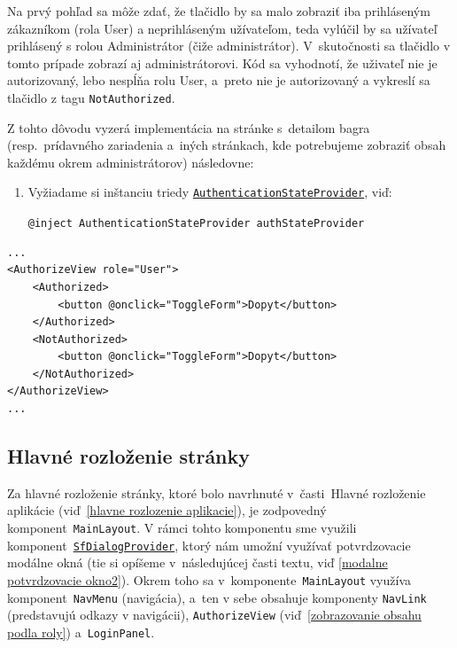 Na prvý pohľad sa môže zdať, že tlačidlo by sa malo zobraziť iba prihláseným zákazníkom (rola User) a neprihláseným užívateľom, teda vylúčil by sa užívateľ prihlásený s rolou Administrátor (čiže administrátor). V~skutočnosti sa tlačidlo v tomto prípade zobrazí aj administrátorovi. Kód sa vyhodnotí, že uživateľ nie je autorizovaný, lebo nespĺňa rolu User, a~preto nie je autorizovaný a vykreslí sa tlačidlo z tagu \verb|NotAuthorized|.

Z tohto dôvodu vyzerá implementácia na stránke s~detailom bagra (resp.~prídavného zariadenia a~iných stránkach, kde potrebujeme zobraziť obsah každému okrem administrátorov) následovne:

\begin{enumerate}
\item Vyžiadame si inštanciu triedy \href{https://learn.microsoft.com/en-us/dotnet/api/microsoft.aspnetcore.components.authorization.authenticationstateprovider?view=aspnetcore-7.0}{\texttt{AuthenticationStateProvider}}, viď:

\verb|@inject AuthenticationStateProvider authStateProvider|

\end{enumerate}

\begin{verbatim}
...
<AuthorizeView role="User">
	<Authorized>
		<button @onclick="ToggleForm">Dopyt</button>
	</Authorized>
	<NotAuthorized>
		<button @onclick="ToggleForm">Dopyt</button>
	</NotAuthorized>
</AuthorizeView>
...
\end{verbatim}

\fi

\subsection{Hlavné rozloženie stránky}
\label{hlavne rozlozenie stranky}

Za hlavné rozloženie stránky, ktoré bolo navrhnuté v~časti~Hlavné rozloženie aplikácie (viď~\ref{hlavne rozlozenie aplikacie}), je zodpovedný komponent~\verb|MainLayout|. V rámci tohto komponentu sme využili komponent~\href{https://help.syncfusion.com/cr/blazor/Syncfusion.Blazor.Popups.SfDialogProvider.html}{\texttt{SfDialogProvider}}, ktorý nám umožní využívať potvrdzovacie modálne okná (tie si opíšeme v~následujúcej časti textu, viď \ref{modalne potvrdzovacie okno2}). Okrem toho sa v~komponente~\verb|MainLayout| využíva komponent~\verb|NavMenu| (navigácia), a~ten v sebe obsahuje komponenty \verb|NavLink| (predstavujú odkazy v navigácii), \verb|AuthorizeView| (viď~\ref{zobrazovanie obsahu podla roly}) a~\verb|LoginPanel|.

